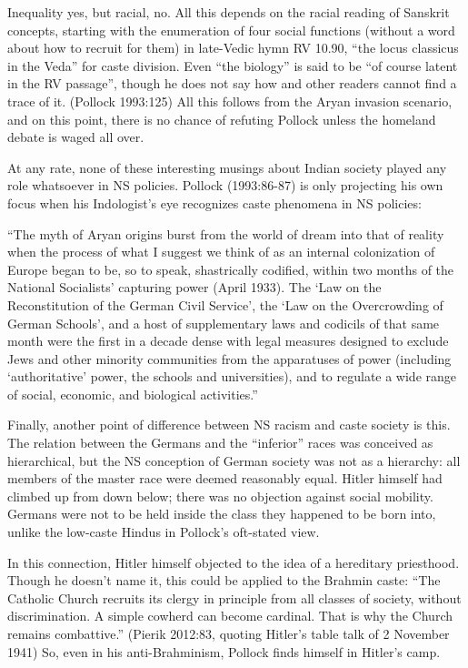 Inequality yes, but racial, no. All this depends on the racial reading of Sanskrit concepts, starting with the enumeration of four social functions (without a word about how to recruit for them) in late-Vedic hymn RV 10.90, “the locus classicus in the Veda” for caste division. Even “the biology” is said to be “of course latent in the RV passage”, though he does not say how and other readers cannot find a trace of it. (Pollock 1993:125) All this follows from the Aryan invasion scenario, and on this point, there is no chance of refuting Pollock unless the homeland debate is waged all over. 

At any rate, none of these interesting musings about Indian society played any role whatsoever in NS policies. Pollock (1993:86-87) is only projecting his own focus when his Indologist’s eye recognizes caste phenomena in NS policies: 
\medskip

\begin{myquote}
“The myth of Aryan origins burst from the world of dream into that of reality when the process of what I suggest we think of as an internal colonization of Europe began to be, so to speak, shastrically codified, within two months of the National Socialists' capturing power (April 1933). The ‘Law on the Reconstitution of the German Civil Service’, the ‘Law on the Overcrowding of German Schools’, and a host of supplementary laws and codicils of that same month were the first in a decade dense with legal measures designed to exclude Jews and other minority communities from the apparatuses of power (including ‘authoritative’ power, the schools and universities), and to regulate a wide range of social, economic, and biological activities.” 
\end{myquote}

Finally, another point of difference between NS racism and caste society is this. The relation between the Germans and the “inferior” races was conceived as hierarchical, but the NS conception of German society was not as a hierarchy: all members of the master race were deemed reasonably equal. Hitler himself had climbed up from down below; there was no objection against social mobility. Germans were not to be held inside the class they happened to be born into, unlike the low-caste Hindus in Pollock’s oft-stated view. 

In this connection, Hitler himself objected to the idea of a hereditary priesthood. Though he doesn’t name it, this could be applied to the Brahmin caste: “The Catholic Church recruits its clergy in principle from all classes of society, without discrimination. A simple cowherd can become cardinal. That is why the Church remains combattive.” (Pierik 2012:83, quoting Hitler’s table talk of 2 November 1941) So, even in his anti-Brahminism, Pollock finds himself in Hitler’s camp.

